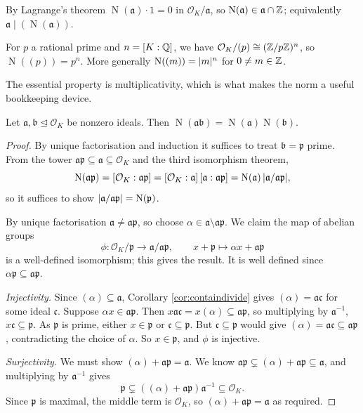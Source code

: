 \documentclass[a4paper]{scrartcl}
\renewcommand{\OO}{\mathcal{O}}
\newcommand{\Nm}{\operatorname{N}}
\newcommand{\fa}{\mathfrak{a}}
\newcommand{\fb}{\mathfrak{b}}
\newcommand{\fc}{\mathfrak{c}}
\newcommand{\fp}{\mathfrak{p}}
\begin{document}
By Lagrange's theorem $\Nm(\fa)\cdot 1 = 0$ in $\OO_K/\fa$, so $\Nm(\fa) \in \fa \cap \Z$; equivalently $\fa \mid (\Nm(\fa))$.

\begin{example}
	For $p$ a rational prime and $n = [K:\mathbb{Q}]$, we have $\OO_K/(p) \cong (\Z/p\Z)^n$, so $\Nm((p)) = p^n$. More generally $\Nm((m)) = \abs{m}^n$ for $0 \neq m \in \mathbb{Z}$.
\end{example}

The essential property is multiplicativity, which is what makes the norm a useful bookkeeping device.

\begin{proposition}\label{prop:normmult}
	Let $\fa, \fb \trianglelefteq \OO_K$ be nonzero ideals. Then $\Nm(\fa\fb) = \Nm(\fa)\Nm(\fb)$.
\end{proposition}

\begin{proof}
	By unique factorisation and induction it suffices to treat $\fb = \fp$ prime. From the tower $\fa\fp \subseteq \fa \subseteq \OO_K$ and the third isomorphism theorem,
	$$\Nm(\fa\fp) = [\OO_K : \fa\fp] = [\OO_K:\fa]\,[\fa : \fa\fp] = \Nm(\fa)\,\abs{\fa/\fa\fp},$$
	so it suffices to show $\abs{\fa/\fa\fp} = \Nm(\fp)$.

	By unique factorisation $\fa \neq \fa\fp$, so choose $\alpha \in \fa \setminus \fa\fp$. We claim the map of abelian groups
	$$\phi : \OO_K/\fp \to \fa/\fa\fp, \qquad x + \fp \mapsto \alpha x + \fa\fp$$
	is a well-defined isomorphism; this gives the result. It is well defined since $\alpha\fp \subseteq \fa\fp$.

	\emph{Injectivity.} Since $(\alpha) \subseteq \fa$, Corollary \ref{cor:containdivide} gives $(\alpha) = \fa\fc$ for some ideal $\fc$. Suppose $\alpha x \in \fa\fp$. Then $x\fa\fc = x(\alpha) \subseteq \fa\fp$, so multiplying by $\fa^{-1}$, $x\fc \subseteq \fp$. As $\fp$ is prime, either $x \in \fp$ or $\fc \subseteq \fp$. But $\fc \subseteq \fp$ would give $(\alpha) = \fa\fc \subseteq \fa\fp$, contradicting the choice of $\alpha$. So $x \in \fp$, and $\phi$ is injective.

	\emph{Surjectivity.} We must show $(\alpha) + \fa\fp = \fa$. We know $\fa\fp \subsetneq (\alpha)+\fa\fp \subseteq \fa$, and multiplying by $\fa^{-1}$ gives
	$$\fp \subsetneq \left((\alpha)+\fa\fp\right)\fa^{-1} \subseteq \OO_K.$$
	Since $\fp$ is maximal, the middle term is $\OO_K$, so $(\alpha)+\fa\fp = \fa$ as required.
\end{proof}
\end{document}
